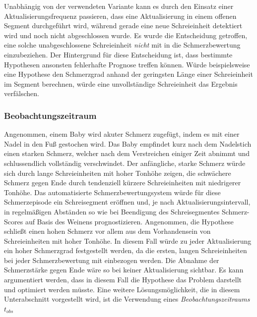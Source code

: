Unabhängig von der verwendeten Variante kann es durch den Einsatz einer Aktualisierungsfrequenz passieren, dass eine Aktualisierung in einem offenen Segment durchgeführt wird, während gerade eine neue Schreieinheit detektiert wird und noch nicht abgeschlossen wurde. Es wurde die Entscheidung getroffen, eine solche unabgeschlossene Schreieinheit \emph{nicht} mit in die Schmerzbewertung einzubeziehen. Der Hintergrund für diese Entscheidung ist, dass bestimmte Hypothesen ansonsten fehlerhafte Prognose treffen können. Würde beispielsweise eine Hypothese den Schmerzgrad anhand der geringsten Länge einer Schreieinheit im Segment berechnen, würde eine unvollständige Schreieinheit das Ergebnis verfälschen.
 
  
 \subsubsection{Beobachtungszeitraum}
 
Angenommen, einem Baby wird akuter Schmerz zugefügt, indem es mit einer Nadel in den Fuß gestochen wird. Das Baby empfindet kurz nach dem Nadelstich einen starken Schmerz, welcher nach dem Verstreichen einiger Zeit abnimmt und schlussendlich vollständig verschwindet. Der anfängliche, starke Schmerz würde sich durch lange Schreieinheiten mit hoher Tonhöhe zeigen, die schwächere Schmerz gegen Ende durch tendenziell kürzere Schreieinheiten mit niedrigerer Tonhöhe.\cite{acutePainResponse} Das automatisierte Schmerzbewertungsystem würde für diese Schmerzepisode ein Schreisegment eröffnen und, je nach Aktualisierungsintervall, in regelmäßigen Abständen so wie bei Beendigung des Schreisegmentes Schmerz-Scores auf Basis des Weinens prognostizieren. Angenommen, die Hypothese schließt einen hohen Schmerz vor allem aus dem Vorhandensein von Schreieinheiten mit hoher Tonhöhe. In diesem Fall würde zu jeder Aktualisierung ein hoher Schmerzgrad festgestellt werden, da die ersten, langen Schreieinheiten bei jeder Schmerzbewertung mit einbezogen werden. Die Abnahme der Schmerzstärke gegen Ende wäre so bei keiner Aktualisierung sichtbar. Es kann argumentiert werden, dass in diesem Fall die Hypothese das Problem darstellt und optimiert werden müsste. Eine weitere Lösungsmöglichkeit, die in diesem Unterabschnitt vorgestellt wird, ist die Verwendung eines \emph{Beobachtungszeitraums} $t_{obs}$

